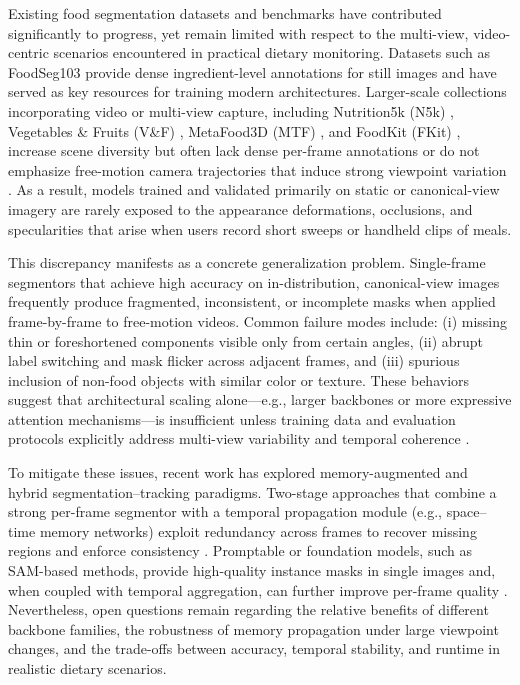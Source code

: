 \documentclass[preprint,12pt]{elsarticle}
\begin{document}
Existing food segmentation datasets and benchmarks have contributed significantly to progress, yet remain limited with respect to the multi-view, video-centric scenarios encountered in practical dietary monitoring. Datasets such as FoodSeg103 \cite{wu2021large} provide dense ingredient-level annotations for still images and have served as key resources for training modern architectures. Larger-scale collections incorporating video or multi-view capture, including Nutrition5k (N5k) \cite{thames2021nutrition5k}, Vegetables \& Fruits (V\&F) \cite{steinbrener2023learning}, MetaFood3D (MTF) \cite{chen2024metafood3d}, and FoodKit (FKit) \cite{haroon2025vole}, increase scene diversity but often lack dense per-frame annotations or do not emphasize free-motion camera trajectories that induce strong viewpoint variation \cite{thames2021nutrition5k, steinbrener2023learning, chen2024metafood3d, haroon2025vole}. As a result, models trained and validated primarily on static or canonical-view imagery are rarely exposed to the appearance deformations, occlusions, and specularities that arise when users record short sweeps or handheld clips of meals.

This discrepancy manifests as a concrete generalization problem. Single-frame segmentors that achieve high accuracy on in-distribution, canonical-view images frequently produce fragmented, inconsistent, or incomplete masks when applied frame-by-frame to free-motion videos. Common failure modes include: (i) missing thin or foreshortened components visible only from certain angles, (ii) abrupt label switching and mask flicker across adjacent frames, and (iii) spurious inclusion of non-food objects with similar color or texture. These behaviors suggest that architectural scaling alone—e.g., larger backbones or more expressive attention mechanisms—is insufficient unless training data and evaluation protocols explicitly address multi-view variability and temporal coherence \cite{zheng2021rethinking, liu2021swin}.

To mitigate these issues, recent work has explored memory-augmented and hybrid segmentation–tracking paradigms. Two-stage approaches that combine a strong per-frame segmentor with a temporal propagation module (e.g., space–time memory networks) exploit redundancy across frames to recover missing regions and enforce consistency \cite{bekuzarov2023xmem++, almughrabi2025foodmem}. Promptable or foundation models, such as SAM-based methods, provide high-quality instance masks in single images and, when coupled with temporal aggregation, can further improve per-frame quality \cite{lan2023foodsam, ravi2024sam}. Nevertheless, open questions remain regarding the relative benefits of different backbone families, the robustness of memory propagation under large viewpoint changes, and the trade-offs between accuracy, temporal stability, and runtime in realistic dietary scenarios.
\end{document}
